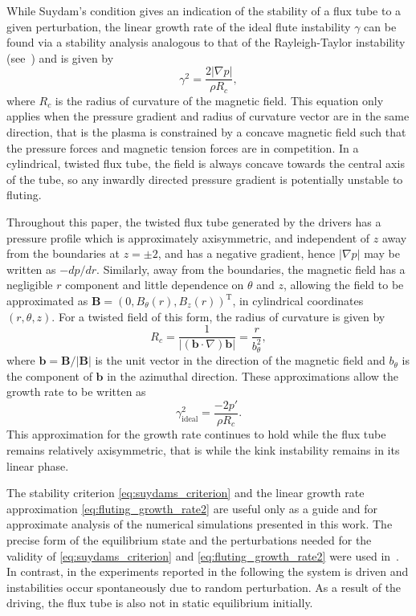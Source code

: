 \documentclass[fleqn,usenatbib]{mnras}
\renewcommand{\vec}[1]{{\bm #1}}
\begin{document}
While Suydam's condition gives an indication of the stability of a flux tube to
a given perturbation, the linear growth rate of the ideal flute instability
$\gamma$ can be found via a stability analysis analogous to that of the
Rayleigh-Taylor instability
(see~\citep[][]{goldstonIntroductionPlasmaPhysics2020}) and is given by
\begin{equation}
  \label{eq:fluting_growth_rate}
\gamma^2 = \frac{2|\nabla p|}{\rho R_c},
\end{equation}
where $R_c$ is the radius of curvature of the magnetic field. This equation
only applies when the pressure gradient and radius of curvature vector are in
the same direction, that is the plasma is constrained by a concave magnetic
field such that the pressure forces and magnetic tension forces are in
competition. In a cylindrical, twisted flux tube, the field is always concave
towards the central axis of the tube, so any inwardly directed pressure
gradient is potentially unstable to fluting.

Throughout this paper, the twisted flux tube generated by the drivers has
a pressure profile which is approximately axisymmetric, and independent of $z$
away from the boundaries at $z=\pm2$, and has a negative gradient, hence
$|\nabla p|$ may be written as $-d p/ dr$. Similarly, away from the boundaries,
the magnetic field has a negligible $r$ component and little dependence on
$\theta$ and $z$, allowing the field to be approximated as $\vec{B} = (0,
B_{\theta}(r), B_z(r))^{\text{T}}$, in cylindrical coordinates $(r, \theta,
z)$. For a twisted field of this form, the radius of curvature is given by
\begin{equation} \label{eq:radius_of_curvature} R_c
= \frac{1}{|(\vec{b}\cdot\nabla) \vec{b}|} = \frac{r}{b_{\theta}^2},
\end{equation} where $\vec{b} = \vec{B}/|\vec{B}|$ is the unit vector in the
direction of the magnetic field and $b_{\theta}$ is the component of $\vec{b}$
in the azimuthal direction. These approximations allow the growth rate to be
written as
\begin{equation}
\label{eq:fluting_growth_rate2}
\gamma_{\text{ideal}}^2 = \frac{-2p'}{\rho R_c}.
\end{equation}
This approximation for the growth rate continues to hold while the flux tube
remains relatively axisymmetric, that is while the kink instability remains in
its linear phase.

The stability criterion \eqref{eq:suydams_criterion} and the linear growth rate
approximation \eqref{eq:fluting_growth_rate2} are useful only as a guide and
for approximate analysis of the numerical simulations presented in this work.
The precise form of the equilibrium state and the perturbations needed for the
validity of \eqref{eq:suydams_criterion} and \eqref{eq:fluting_growth_rate2}
were used in~\citet{quinnEffectAnisotropicViscosity2020}. In contrast, in the
experiments reported in the following the system is driven and instabilities
occur spontaneously due to random perturbation. As a result of the driving, the
flux tube is also not in static equilibrium initially.
\end{document}
